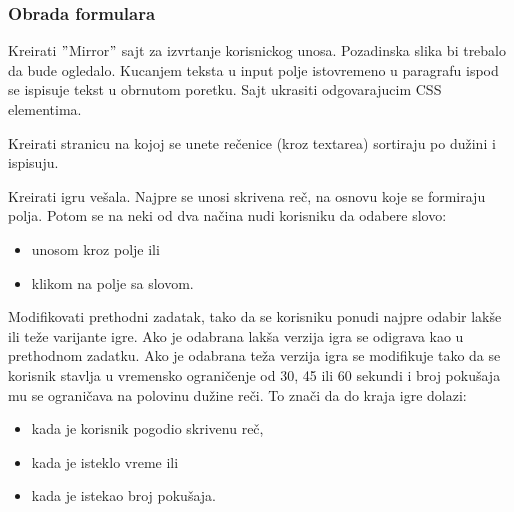 \subsubsection{Obrada formulara}

\begin{primer}
Kreirati $"$Mirror$"$ sajt za izvrtanje korisnickog unosa. Pozadinska slika bi trebalo da bude
ogledalo. Kucanjem teksta u input polje istovremeno u paragrafu ispod se ispisuje tekst u 
obrnutom poretku. Sajt ukrasiti odgovarajucim CSS elementima.
\end{primer}

\begin{primer}
Kreirati stranicu na kojoj se unete rečenice (kroz textarea) sortiraju po dužini i ispisuju.
\end{primer}

\begin{primer}
Kreirati igru vešala. Najpre se unosi skrivena reč, na osnovu koje se formiraju polja. Potom se na neki od dva načina nudi korisniku da odabere slovo:
\begin{itemize}
\item unosom kroz polje ili
\item klikom na polje sa slovom.
\end{itemize}

\end{primer}

\begin{primer}
Modifikovati prethodni zadatak, tako da se korisniku ponudi najpre odabir lakše ili teže varijante igre. Ako je odabrana lakša verzija igra se odigrava kao u prethodnom zadatku.  Ako je odabrana teža verzija igra se modifikuje tako da se korisnik stavlja u vremensko ograničenje od 30, 45 ili 60 sekundi i broj pokušaja mu se ograničava na polovinu dužine reči. To znači da do kraja igre dolazi:
\begin{itemize}
\item kada je korisnik pogodio skrivenu reč,
\item kada je isteklo vreme ili
\item kada je istekao broj pokušaja.
\end{itemize}
\end{primer}

